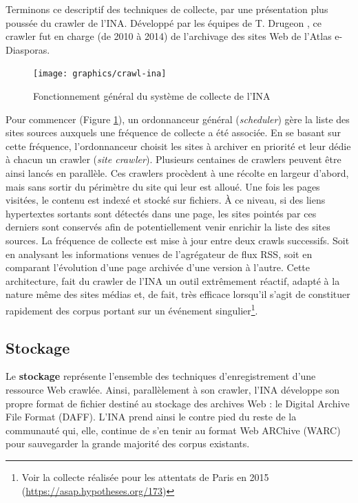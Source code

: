\documentclass[symmetric,justified,marginals=raggedouter]{tufte-book}
\begin{document}
Terminons ce descriptif des techniques de collecte, par une présentation plus poussée du crawler de l'INA. Développé par les équipes de T. Drugeon \citep{drugeon_technical_2005}, ce crawler fut en charge (de 2010 à 2014) de l'archivage des sites Web de l'Atlas e-Diasporas. 

\begin{figure}%
  \texttt{[image: graphics/crawl-ina]}
  \caption{Fonctionnement général du système de collecte de l'INA}
  \label{fig:crawl-ina}
\end{figure}

\noindent Pour commencer (Figure \ref{fig:crawl-ina}), un ordonnanceur général (\textit{scheduler}) gère la liste des sites sources auxquels une fréquence de collecte a été associée. En se basant sur cette fréquence, l'ordonnanceur choisit les sites à archiver en priorité et leur dédie à chacun un crawler (\textit{site crawler}). Plusieurs centaines de crawlers peuvent être ainsi lancés en parallèle. Ces crawlers procèdent à une récolte en largeur d'abord, mais sans sortir du périmètre du site qui leur est alloué. Une fois les pages visitées, le contenu est indexé et stocké sur fichiers. À ce niveau, si des liens hypertextes sortants sont détectés dans une page, les sites pointés par ces derniers sont conservés afin de potentiellement venir enrichir la liste des sites sources. La fréquence de collecte est mise à jour entre deux crawls successifs. Soit en analysant les informations venues de l'agrégateur de flux RSS, soit en comparant l'évolution d'une page archivée d'une version à l'autre. Cette architecture, fait du crawler de l'INA un outil extrêmement réactif, adapté à la nature même des sites médias et, de fait, très efficace lorsqu'il s'agit de constituer rapidement des corpus portant sur un événement singulier\footnote{Voir la collecte réalisée pour les attentats de Paris en 2015 (\url{https://asap.hypotheses.org/173})}.

\subsection{Stockage}

\noindent Le \textbf{stockage} représente l'ensemble des techniques d'enregistrement d'une ressource Web crawlée. Ainsi, parallèlement à son crawler, l'INA développe son propre format de fichier destiné au stockage des archives Web : le Digital Archive File Format (DAFF). L'INA prend ainsi le contre pied du reste de la communauté qui, elle, continue de s'en tenir au format Web ARChive (WARC) pour sauvegarder la grande majorité des corpus existants.
\end{document}
